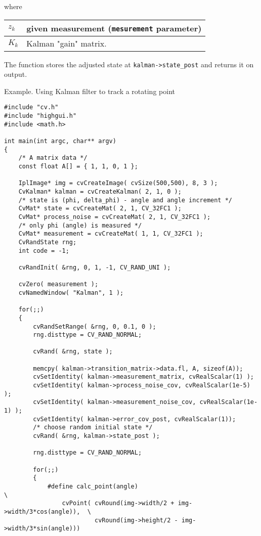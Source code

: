 where

\begin{tabular}{l p{4 in}}
\hline
$z_k$ & given measurement (\texttt{mesurement} parameter)\\ \hline
$K_k$ & Kalman "gain" matrix.\\ \hline
\end{tabular}

The function stores the adjusted state at \texttt{kalman->state\_post} and returns it on output.

\ifC
Example. Using Kalman filter to track a rotating point
\begin{lstlisting}
#include "cv.h"
#include "highgui.h"
#include <math.h>

int main(int argc, char** argv)
{
    /* A matrix data */
    const float A[] = { 1, 1, 0, 1 };

    IplImage* img = cvCreateImage( cvSize(500,500), 8, 3 );
    CvKalman* kalman = cvCreateKalman( 2, 1, 0 );
    /* state is (phi, delta_phi) - angle and angle increment */
    CvMat* state = cvCreateMat( 2, 1, CV_32FC1 );
    CvMat* process_noise = cvCreateMat( 2, 1, CV_32FC1 );
    /* only phi (angle) is measured */
    CvMat* measurement = cvCreateMat( 1, 1, CV_32FC1 );
    CvRandState rng;
    int code = -1;

    cvRandInit( &rng, 0, 1, -1, CV_RAND_UNI );

    cvZero( measurement );
    cvNamedWindow( "Kalman", 1 );

    for(;;)
    {
        cvRandSetRange( &rng, 0, 0.1, 0 );
        rng.disttype = CV_RAND_NORMAL;

        cvRand( &rng, state );

        memcpy( kalman->transition_matrix->data.fl, A, sizeof(A));
        cvSetIdentity( kalman->measurement_matrix, cvRealScalar(1) );
        cvSetIdentity( kalman->process_noise_cov, cvRealScalar(1e-5) );
        cvSetIdentity( kalman->measurement_noise_cov, cvRealScalar(1e-1) );
        cvSetIdentity( kalman->error_cov_post, cvRealScalar(1));
        /* choose random initial state */
        cvRand( &rng, kalman->state_post );

        rng.disttype = CV_RAND_NORMAL;

        for(;;)
        {
            #define calc_point(angle)                                      \
                cvPoint( cvRound(img->width/2 + img->width/3*cos(angle)),  \
                         cvRound(img->height/2 - img->width/3*sin(angle)))


\end{lstlisting}
